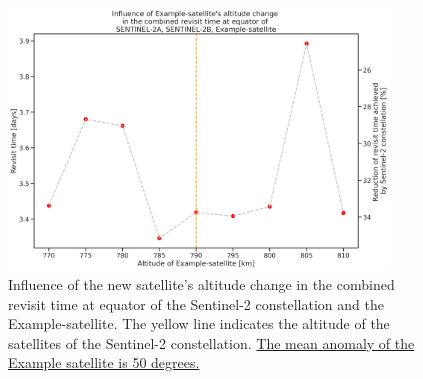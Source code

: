
\begin{figure}
\centering
\includegraphics[width=0.9\textwidth]{Images/revisit_time_ofdoubleaxisaltitude_SENTINEL-2A_SENTINEL-2B_Example-satellite_50deg.png}
\caption{Influence of the new satellite's altitude change in the combined revisit time at equator of the Sentinel-2 constellation and the Example-satellite. The yellow line indicates the altitude of the satellites of the Sentinel-2 constellation. \underline{The mean anomaly of the Example satellite is 50 degrees.}}
\label{revisit_time_ofdoubleaxisaltitude_SENTINEL-2A_SENTINEL-2B_Example-satellite_50deg}
\end{figure}

